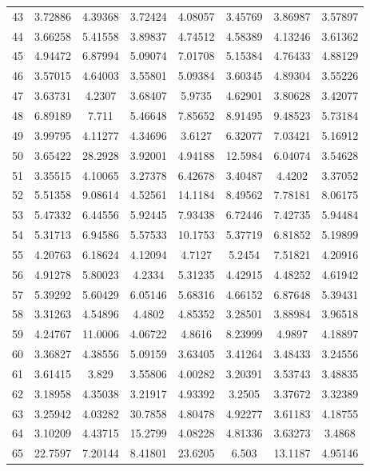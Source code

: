 \begin{center}
\begin{longtable}{cccccccc}
43 & 3.72886 & 4.39368 & 3.72424 & 4.08057 & 3.45769 & 3.86987 & 3.57897\\
44 & 3.66258 & 5.41558 & 3.89837 & 4.74512 & 4.58389 & 4.13246 & 3.61362\\
45 & 4.94472 & 6.87994 & 5.09074 & 7.01708 & 5.15384 & 4.76433 & 4.88129\\
46 & 3.57015 & 4.64003 & 3.55801 & 5.09384 & 3.60345 & 4.89304 & 3.55226\\
47 & 3.63731 & 4.2307 & 3.68407 & 5.9735 & 4.62901 & 3.80628 & 3.42077\\
48 & 6.89189 & 7.711 & 5.46648 & 7.85652 & 8.91495 & 9.48523 & 5.73184\\
49 & 3.99795 & 4.11277 & 4.34696 & 3.6127 & 6.32077 & 7.03421 & 5.16912\\
50 & 3.65422 & 28.2928 & 3.92001 & 4.94188 & 12.5984 & 6.04074 & 3.54628\\
51 & 3.35515 & 4.10065 & 3.27378 & 6.42678 & 3.40487 & 4.4202 & 3.37052\\
52 & 5.51358 & 9.08614 & 4.52561 & 14.1184 & 8.49562 & 7.78181 & 8.06175\\
53 & 5.47332 & 6.44556 & 5.92445 & 7.93438 & 6.72446 & 7.42735 & 5.94484\\
54 & 5.31713 & 6.94586 & 5.57533 & 10.1753 & 5.37719 & 6.81852 & 5.19899\\
55 & 4.20763 & 6.18624 & 4.12094 & 4.7127 & 5.2454 & 7.51821 & 4.20916\\
56 & 4.91278 & 5.80023 & 4.2334 & 5.31235 & 4.42915 & 4.48252 & 4.61942\\
57 & 5.39292 & 5.60429 & 6.05146 & 5.68316 & 4.66152 & 6.87648 & 5.39431\\
58 & 3.31263 & 4.54896 & 4.4802 & 4.85352 & 3.28501 & 3.88984 & 3.96518\\
59 & 4.24767 & 11.0006 & 4.06722 & 4.8616 & 8.23999 & 4.9897 & 4.18897\\
60 & 3.36827 & 4.38556 & 5.09159 & 3.63405 & 3.41264 & 3.48433 & 3.24556\\
61 & 3.61415 & 3.829 & 3.55806 & 4.00282 & 3.20391 & 3.53743 & 3.48835\\
62 & 3.18958 & 4.35038 & 3.21917 & 4.93392 & 3.2505 & 3.37672 & 3.32389\\
63 & 3.25942 & 4.03282 & 30.7858 & 4.80478 & 4.92277 & 3.61183 & 4.18755\\
64 & 3.10209 & 4.43715 & 15.2799 & 4.08228 & 4.81336 & 3.63273 & 3.4868\\
65 & 22.7597 & 7.20144 & 8.41801 & 23.6205 & 6.503 & 13.1187 & 4.95146\\

\end{longtable}
\end{center}
